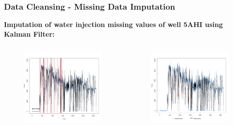 \documentclass[xcolor=table]{beamer}
\begin{document}
\begin{frame}
\frametitle{Data Cleansing - Missing Data Imputation}
\textbf{Imputation of water injection missing values of well 5AHI using Kalman Filter:}
\begin{columns}[c]

\begin{figure}
\includegraphics[width=1\linewidth,left]{WI_missing2.png} 
\end{figure}


\begin{figure}
\includegraphics[width=1\linewidth,left]{WI_imputation2.png} 
\end{figure}

\end{columns}
\end{frame}
\end{document}

